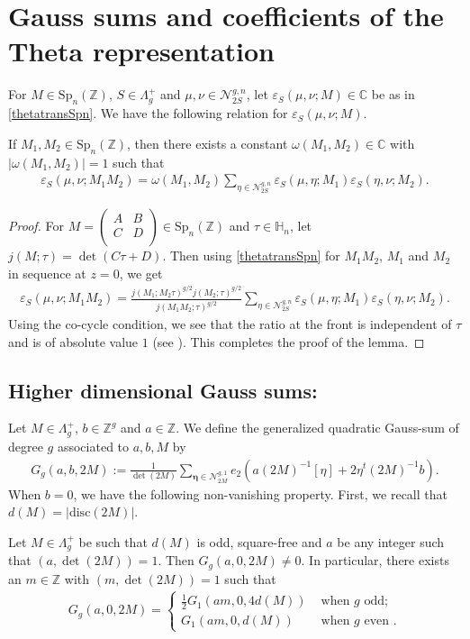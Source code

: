 \documentclass[11pt]{amsart}
\numberwithin{equation}{section}
\newcommand{\mbb}{\mathbb}
\newcommand{\mc}{\mathcal}
\newcommand{\mrm}{\mathrm} %
\newcommand{\smat}[4]{\left( \begin{smallmatrix} #1 & #2 \\ #3 & #4 \\ \end{smallmatrix} \right)}
\newcommand{\sumn}{\sum \nolimits}
\begin{document}
\section{Gauss sums and coefficients of the Theta representation}
For $M\in \mrm{Sp}_n(\mbb Z)$, $S\in \Lambda^+_g$ and $\mu,\nu\in \mc N_{2S}^{g,n}$, let $\varepsilon_S(\mu, \nu; M)\in \mbb C$ be as in \eqref{thetatransSpn}. We have the following relation for $\varepsilon_S(\mu, \nu; M)$.
\begin{lemma}
If $M_1, M_2\in \mrm{Sp}_n(\mbb Z)$, then there exists a constant $\omega(M_1, M_2)\in \mbb C$ with $|\omega(M_1, M_2)|=1$ such that
\begin{align}\label{epsilonmunu}
\varepsilon_S(\mu, \nu; M_1M_2)= \omega(M_1, M_2)\sumn_{\eta\in \mc N_{2S}^{g,n}}\varepsilon_S(\mu, \eta; M_1)\varepsilon_S(\eta, \nu; M_2).  
\end{align}
\end{lemma}
\begin{proof}
For $M=\smat{A}{B}{C}{D}\in \mrm{Sp}_n(\mbb Z)$ and $\tau\in \mbb H_n$, let $j(M; \tau)= \det(C\tau+D)$. Then using \eqref{thetatransSpn} for $M_1M_2$, $M_1$ and $M_2$ in sequence at $z=0$, we get
\begin{align}
\varepsilon_S(\mu, \nu; M_1M_2)= \frac{j(M_1; M_2\tau)^{g/2}j(M_2;\tau)^{g/2}}{j(M_1M_2; \tau)^{g/2}}    \sum_{\eta\in \mc N_{2S}^{g,n}}\varepsilon_S(\mu, \eta; M_1)\varepsilon_S(\eta, \nu; M_2).
\end{align}
Using the co-cycle condition, we see that the ratio at the front is independent of $\tau$ and is of absolute value $1$ (see \cite[Section 3]{freitag2006singular}). This completes the proof of the lemma.
\end{proof}
\subsection{Higher dimensional Gauss sums:}\label{sec:HDGauss}
Let $M\in \Lambda^+_g$, $b\in\mbb Z^g$ and $a\in \mbb Z$. We define the generalized quadratic Gauss-sum of degree $g$ associated to $a,b, M$ by
\begin{align} \label{gauss}
    G_g(a, b, 2M):= \frac{1}{\det(2M)}\sum_{\bm\eta\in \mc N_{2M}^{g,1}} e_2\left(a (2M)^{-1}[\eta]+2 \eta^t(2M)^{-1}b\right).
\end{align}
When $b=0$, we have the following non-vanishing property. First, we recall that $d(M)=|\mrm{disc}(2M)|$.
\begin{proposition}\label{gauss-nonvan}
  Let $M\in \Lambda_g^+$ be such that $d(M)$ is odd, square-free and $a$ be any integer such that $(a, \det(2M))=1$. Then $G_g(a, 0, 2M)\neq 0$. In particular, there exists an $m\in \mbb Z$ with $(m, \det(2M))=1$ such that
  \begin{align}
  G_g(a, 0, 2M)=\begin{cases}
      \frac{1}{2}G_1(am, 0, 4d(M)) & \text{ when } g \text{ odd};\\
      G_1(am, 0, d(M))&\text{ when } g \text{ even }.
  \end{cases}    
  \end{align}

\end{proposition}
   
\end{document}
